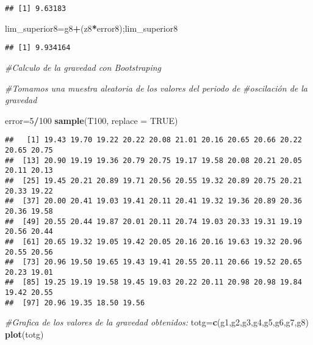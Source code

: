 \documentclass[
]{article}
\newenvironment{Shaded}{\begin{snugshade}}{\end{snugshade}}
\newcommand{\AttributeTok}[1]{\textcolor[rgb]{0.13,0.29,0.53}{#1}}
\newcommand{\CommentTok}[1]{\textcolor[rgb]{0.56,0.35,0.01}{\textit{#1}}}
\newcommand{\ConstantTok}[1]{\textcolor[rgb]{0.56,0.35,0.01}{#1}}
\newcommand{\DecValTok}[1]{\textcolor[rgb]{0.00,0.00,0.81}{#1}}
\newcommand{\FunctionTok}[1]{\textcolor[rgb]{0.13,0.29,0.53}{\textbf{#1}}}
\newcommand{\NormalTok}[1]{#1}
\newcommand{\OtherTok}[1]{\textcolor[rgb]{0.56,0.35,0.01}{#1}}
\newcommand{\SpecialCharTok}[1]{\textcolor[rgb]{0.81,0.36,0.00}{\textbf{#1}}}
\begin{document}
\begin{verbatim}
## [1] 9.63183
\end{verbatim}

\begin{Shaded}
\begin{Highlighting}[]
\NormalTok{lim\_superior8}\OtherTok{=}\NormalTok{g8}\SpecialCharTok{+}\NormalTok{(z8}\SpecialCharTok{*}\NormalTok{error8);lim\_superior8}
\end{Highlighting}
\end{Shaded}

\begin{verbatim}
## [1] 9.934164
\end{verbatim}

\begin{Shaded}
\begin{Highlighting}[]
\CommentTok{\#Calculo de la gravedad con Bootstraping}

\CommentTok{\#Tomamos una muestra aleatoria de los valores del periodo de }
\CommentTok{\#oscilación de la gravedad}

\NormalTok{error}\OtherTok{=}\DecValTok{5}\SpecialCharTok{/}\DecValTok{100}
\FunctionTok{sample}\NormalTok{(T100, }\AttributeTok{replace =} \ConstantTok{TRUE}\NormalTok{)}
\end{Highlighting}
\end{Shaded}

\begin{verbatim}
##   [1] 19.43 19.70 19.22 20.22 20.08 21.01 20.16 20.65 20.66 20.22 20.65 20.75
##  [13] 20.90 19.19 19.36 20.79 20.75 19.17 19.58 20.08 20.21 20.05 20.11 20.13
##  [25] 19.45 20.21 20.89 19.71 20.56 20.55 19.32 20.89 20.75 20.21 20.33 19.22
##  [37] 20.00 20.41 19.03 19.41 20.11 20.41 19.32 19.36 20.89 20.36 20.36 19.58
##  [49] 20.55 20.44 19.87 20.01 20.11 20.74 19.03 20.33 19.31 19.19 20.56 20.44
##  [61] 20.65 19.32 19.05 19.42 20.05 20.16 20.16 19.63 19.32 20.96 20.55 20.56
##  [73] 20.96 19.50 19.65 19.43 19.41 20.55 20.11 20.66 19.52 20.65 20.23 19.01
##  [85] 19.25 19.19 19.58 19.45 19.03 20.22 20.11 20.98 20.98 19.84 19.42 20.55
##  [97] 20.96 19.35 18.50 19.56
\end{verbatim}

\begin{Shaded}
\begin{Highlighting}[]
\CommentTok{\#Grafica de los valores de la gravedad obtenidos:}
\NormalTok{totg}\OtherTok{=}\FunctionTok{c}\NormalTok{(g1,g2,g3,g4,g5,g6,g7,g8)}
\FunctionTok{plot}\NormalTok{(totg)}
\end{Highlighting}
\end{Shaded}
\end{document}
